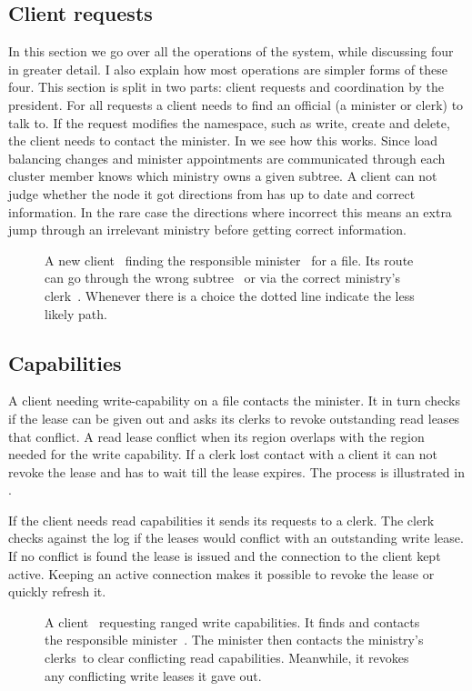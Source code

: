 \subsection{Client requests} %
In this section we go over all the operations of the system, while discussing four in greater detail. I also explain how most operations are simpler forms of these four. This section is split in two parts: client requests and coordination by the president.
%
For all requests a client needs to find an official (a minister or clerk) to talk to. If the request modifies the namespace, such as write, create and delete, the client needs to contact the minister. In  we see how this works. Since load balancing changes and minister appointments are communicated through \raft{} each cluster member knows which ministry owns a given subtree. A client can not judge whether the node it got directions from has up to date and correct information. In the rare case the directions where incorrect this means an extra jump through an irrelevant ministry before getting correct information.
%
\begin{figure}[htbp]
	\centering
	
	\caption{A new client~\clientLeg{} finding the responsible minister~\amdsLeg{} for a file. Its route can go through the wrong subtree~\umdsLeg{} or via the correct ministry's clerk~\cmdsLeg{}. Whenever there is a choice the dotted line indicate the less likely path.}
	\label{fig:find_aMDS}
\end{figure}
%
\subsection*{Capabilities} \label{sec:lease}
A client needing write-capability on a file contacts the minister. It in turn checks if the lease can be given out and asks its clerks to revoke outstanding read leases that conflict. A read lease conflict when its region overlaps with the region needed for the write capability. If a clerk lost contact with a client it can not revoke the lease and has to wait till the lease expires. The process is illustrated in . 

If the client needs read capabilities it sends its requests to a clerk. The clerk checks against the \raft{} log if the leases would conflict with an outstanding write lease. If no conflict is found the lease is issued and the connection to the client kept active. Keeping an active connection makes it possible to revoke the lease or quickly refresh it.
%
\begin{figure}[htbp]
	\centering
	
	\caption{A client~\clientLeg{} requesting ranged write capabilities. It finds and contacts the responsible minister~\amdsLeg{}. The minister then contacts the ministry's clerks~\cmdsLeg to clear conflicting read capabilities. Meanwhile, it revokes any conflicting write leases it gave out.}
	\label{fig:write}
\end{figure}
%
